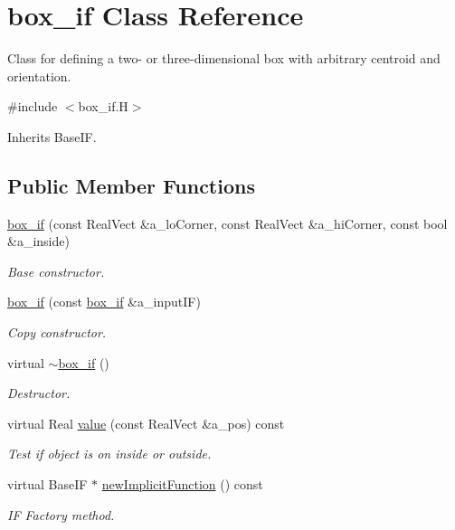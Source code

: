 \hypertarget{classbox__if}{}\section{box\+\_\+if Class Reference}
\label{classbox__if}


Class for defining a two-\/ or three-\/dimensional box with arbitrary centroid and orientation.  




{\ttfamily \#include $<$box\+\_\+if.\+H$>$}



Inherits Base\+IF.

\subsection*{Public Member Functions}
\begin{DoxyCompactItemize}
\item 
\hyperlink{classbox__if_ab3b47b80c0de1f2de1ffd4c95fae0920}{box\+\_\+if} (const Real\+Vect \&a\+\_\+lo\+Corner, const Real\+Vect \&a\+\_\+hi\+Corner, const bool \&a\+\_\+inside)
\begin{DoxyCompactList}\small\item\em Base constructor. \end{DoxyCompactList}\item 
\hyperlink{classbox__if_a93a65c4006175eb30cce9e57e4910bb3}{box\+\_\+if} (const \hyperlink{classbox__if}{box\+\_\+if} \&a\+\_\+input\+IF)
\begin{DoxyCompactList}\small\item\em Copy constructor. \end{DoxyCompactList}\item 
virtual \hyperlink{classbox__if_a38fc4b461bbb53751245deff6f4c55a9}{$\sim$box\+\_\+if} ()
\begin{DoxyCompactList}\small\item\em Destructor. \end{DoxyCompactList}\item 
virtual Real \hyperlink{classbox__if_a900fdd2475884c1677917d9ee971049b}{value} (const Real\+Vect \&a\+\_\+pos) const 
\begin{DoxyCompactList}\small\item\em Test if object is on inside or outside. \end{DoxyCompactList}\item 
virtual Base\+IF $\ast$ \hyperlink{classbox__if_a0207b5e85a13f448a449c32425370318}{new\+Implicit\+Function} () const 
\begin{DoxyCompactList}\small\item\em IF Factory method. \end{DoxyCompactList}\end{DoxyCompactItemize}
